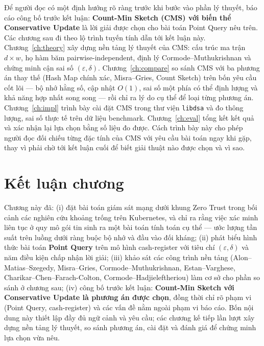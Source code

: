 Để người đọc có một định hướng rõ ràng trước khi bước vào phần lý thuyết, báo cáo công bố trước kết luận: \textbf{Count-Min Sketch (CMS) với biến thể Conservative Update} là lời giải được chọn cho bài toán Point Query nêu trên. Các chương sau đi theo lộ trình tuyến tính dẫn tới kết luận này. Chương~\ref{ch:theory} xây dựng nền tảng lý thuyết của CMS: cấu trúc ma trận $d \times w$, họ hàm băm pairwise-independent, định lý Cormode--Muthukrishnan và chứng minh cận sai số $(\varepsilon, \delta)$. Chương~\ref{ch:compare} so sánh CMS với ba phương án thay thế (Hash Map chính xác, Misra--Gries, Count Sketch) trên bốn yêu cầu cốt lõi --- bộ nhớ hằng số, cập nhật $O(1)$, sai số một phía có thể định lượng và khả năng hợp nhất song song --- rồi chỉ ra lý do cụ thể để loại từng phương án. Chương~\ref{ch:impl} trình bày cài đặt CMS trong thư viện \texttt{libdsa} và đo thông lượng, sai số thực tế trên dữ liệu benchmark. Chương~\ref{ch:eval} tổng kết kết quả và xác nhận lại lựa chọn bằng số liệu đo được. Cách trình bày này cho phép người đọc đối chiếu từng đặc tính của CMS với yêu cầu bài toán ngay khi gặp, thay vì phải chờ tới kết luận cuối để biết giải thuật nào được chọn và vì sao.

\section{Kết luận chương}

Chương này đã: (i) đặt bài toán giám sát mạng dưới khung Zero Trust trong bối cảnh các nghiên cứu khoảng trống trên Kubernetes, và chỉ ra rằng việc xác minh liên tục ở quy mô gói tin sinh ra một bài toán tính toán cụ thể --- ước lượng tần suất trên luồng dưới ràng buộc bộ nhớ và đầu vào đối kháng; (ii) phát biểu hình thức bài toán \textbf{Point Query} trên mô hình cash-register với tiêu chí $(\varepsilon, \delta)$ và năm điều kiện chấp nhận lời giải; (iii) khảo sát các công trình nền tảng (Alon--Matias--Szegedy, Misra--Gries, Cormode--Muthukrishnan, Estan--Varghese, Charikar--Chen--Farach-Colton, Cormode--Hadjieleftheriou) làm cơ sở cho phần so sánh ở chương sau; (iv) công bố trước kết luận: \textbf{Count-Min Sketch với Conservative Update là phương án được chọn}, đồng thời chỉ rõ phạm vi (Point Query, cash-register) và các vấn đề nằm ngoài phạm vi báo cáo. Bốn nội dung này thiết lập đầy đủ ngữ cảnh và yêu cầu; các chương kế tiếp lần lượt xây dựng nền tảng lý thuyết, so sánh phương án, cài đặt và đánh giá để chứng minh lựa chọn vừa nêu.
